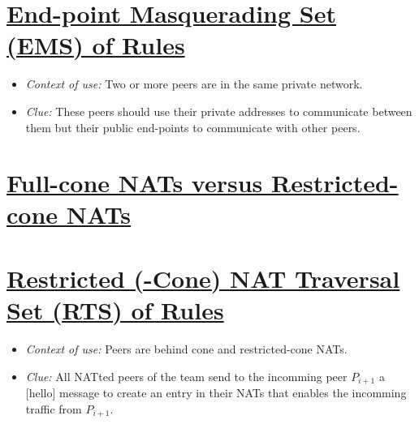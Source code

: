 \documentclass{article}
\begin{document}

\section{\href{http://www.p2psp.org/en/p2psp-protocol?cap=indexsu12.xht\#x20-170004.12}{End-point Masquerading Set (EMS) of Rules}}

\begin{itemize}
\item \emph{Context of use:} Two or more peers are in the same private network.
\item \emph{Clue:} These peers should use their private addresses to
  communicate between them but their public end-points to communicate
  with other peers.
\end{itemize}

\ifx \HCode\Undfef
\else
{}
\fi


\section*{\href{http://en.wikipedia.org/wiki/Network_address_translation}{Full-cone NATs versus Restricted-cone NATs}}

\ifx \HCode\Undfef
\else
{}
\fi


\section{\href{http://www.p2psp.org/en/p2psp-protocol?cap=indexsu9.xht\#x18-140004.9}{Restricted (-Cone) NAT Traversal Set (RTS) of Rules}}

\begin{itemize}
\item \emph{Context of use:} Peers are behind cone and restricted-cone NATs.
\item \emph{Clue:} All NATted peers of the team send to the incomming
  peer $P_{i+1}$ a [hello] message to create an entry in their NATs
  that enables the incomming traffic from $P_{i+1}$.
\end{itemize}
\end{document}
